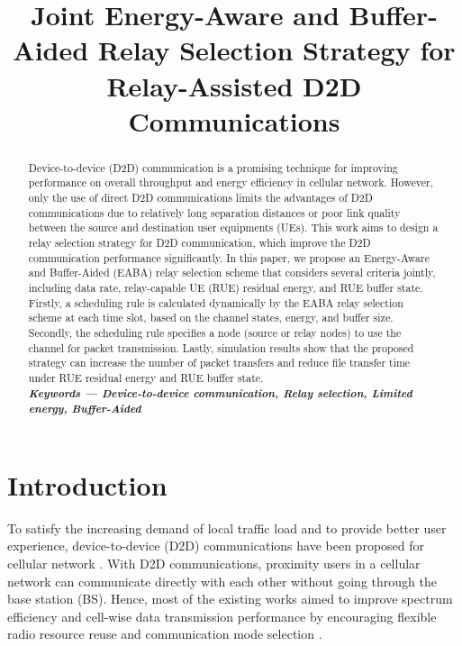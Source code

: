 \documentclass[conference]{IEEEtran}
\begin{document}
\title{Joint Energy-Aware and Buffer-Aided Relay Selection Strategy for Relay-Assisted D2D Communications}

\author{
}


\maketitle
\begin{abstract}
Device-to-device (D2D) communication is a promising technique for improving performance on overall throughput and energy efficiency in cellular network. However, only the use of direct D2D communications limits the advantages of D2D communications due to relatively long separation distances or poor link quality between the source and destination user equipments (UEs). This work aims to design a relay selection strategy for D2D communication, which improve the D2D communication performance significantly. In this paper, we propose an Energy-Aware and Buffer-Aided (EABA) relay selection scheme that considers several criteria jointly, including data rate, relay-capable UE (RUE) residual energy, and RUE buffer state. Firstly, a scheduling rule is calculated dynamically by the EABA relay selection scheme at each time slot, based on the channel states, energy, and buffer size. Secondly, the scheduling rule specifies a node (source or relay nodes) to use the channel for packet transmission. Lastly, simulation results show that the proposed strategy can increase the number of packet transfers and reduce file transfer time under RUE residual energy and RUE buffer state.
\\
\textbf {\small \emph{Keywords --- Device-to-device communication, Relay selection, Limited energy, Buffer-Aided}}
\end{abstract}

\IEEEpeerreviewmaketitle
\section{Introduction}
To satisfy the increasing demand of local traffic load and to provide better user experience, device-to-device (D2D) communications have been proposed for cellular network \cite{5350367,7949342,7254241}. With D2D communications, proximity users in a cellular network can communicate directly with each other without going through the base station (BS). Hence, most of the existing works aimed to improve spectrum efficiency and cell-wise data transmission performance by encouraging flexible radio resource reuse and communication mode selection \cite{7878672,7504380,7553029,6848856,7742334}.
\end{document}
